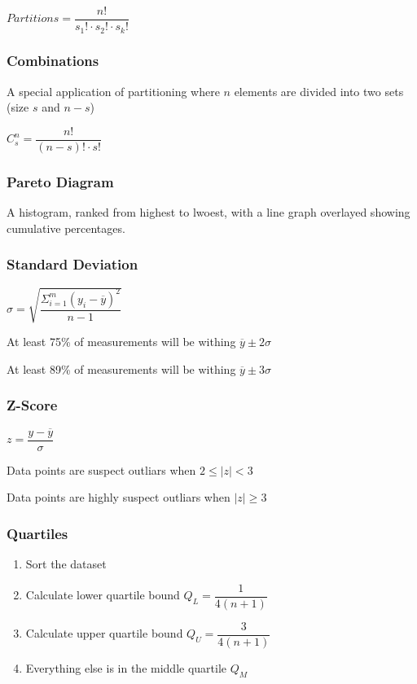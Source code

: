 \documentclass{hitec}
\begin{document}
$Partitions = \dfrac{n!}{s_1!\cdot s_2!\cdot s_k!}$

\subsubsection*{Combinations}
A special application of partitioning where $n$ elements are divided into two sets (size $s$ and $n-s$)

$C^n_s = \dfrac{n!}{(n-s)!\cdot s!}$
\subsubsection*{Pareto Diagram}
A histogram, ranked from highest to lwoest, with a line graph overlayed showing cumulative percentages.

\subsubsection*{Standard Deviation}
$\sigma = \sqrt{\dfrac{\Sigma^m_{i=1}(y_i - \overline{y})^2}{n-1}}$

At least 75\% of measurements will be withing $\overline{y}\pm 2\sigma$

At least 89\% of measurements will be withing $\overline{y}\pm 3\sigma$

\subsubsection*{Z-Score}
$z = \dfrac{y-\overline{y}}{\sigma}$

Data points are suspect outliars when $2\le |z| < 3$

Data points are highly suspect outliars when $|z| \ge 3$

\subsubsection*{Quartiles}
\begin{enumerate}
	\item Sort the dataset
	\item Calculate lower quartile bound $Q_L = \dfrac{1}{4(n+1)}$
	\item Calculate upper quartile bound $Q_U = \dfrac{3}{4(n+1)}$
	\item Everything else is in the middle quartile $Q_M$
\end{enumerate}
\end{document}
